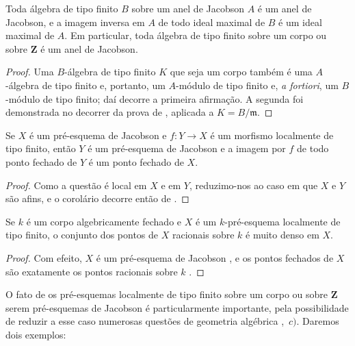 \begin{corollary}[10.4.6]
\label{IV.10.4.6}
Toda álgebra de tipo finito $B$ sobre um anel de Jacobson $A$ é um anel de Jacobson, e a imagem inversa em $A$ de todo ideal maximal de $B$ é um ideal maximal de $A$.
Em particular, toda álgebra de tipo finito sobre um corpo ou sobre $\mathbf{Z}$ é um anel de Jacobson.
\end{corollary}

\begin{proof}
Uma $B$-álgebra de tipo finito $K$ que seja um corpo também é uma $A$-álgebra de tipo finito e, portanto, um $A$-módulo de tipo finito e, \emph{a fortiori}, um $B$-módulo de tipo finito; daí decorre a primeira afirmação.
A segunda foi demonstrada no decorrer da prova de , aplicada a $K=B/\mathfrak{m}$.
\end{proof}

\begin{corollary}[10.4.7]
\label{IV.10.4.7}
Se $X$ é um pré-esquema de Jacobson e $f:Y\to X$ é um morfismo localmente de tipo finito, então $Y$ é um pré-esquema de Jacobson e a imagem por $f$ de todo ponto fechado de $Y$ é um ponto fechado de $X$.
\end{corollary}

\begin{proof}
Como a questão é local em $X$ e em $Y$, reduzimo-nos ao caso em que $X$ e $Y$ são afins, e o corolário decorre então de .
\end{proof}

\begin{corollary}[10.4.8]
\label{IV.10.4.8}
Se $k$ é um corpo algebricamente fechado e $X$ é um $k$-pré-esquema localmente de tipo finito, o conjunto dos pontos de $X$ racionais sobre $k$ é muito denso em $X$.
\end{corollary}

\begin{proof}
Com efeito, $X$ é um pré-esquema de Jacobson , e os pontos fechados de $X$ são exatamente os pontos racionais sobre $k$ .
\end{proof}

\begin{env}[10.4.9]
\label{IV.10.4.9}
O fato de os pré-esquemas localmente de tipo finito sobre um corpo ou sobre $\mathbf{Z}$ serem pré-esquemas de Jacobson é particularmente importante, pela possibilidade de reduzir a esse caso numerosas questões de geometria algébrica ,~$c)$.
Daremos dois exemplos:
\end{env}

